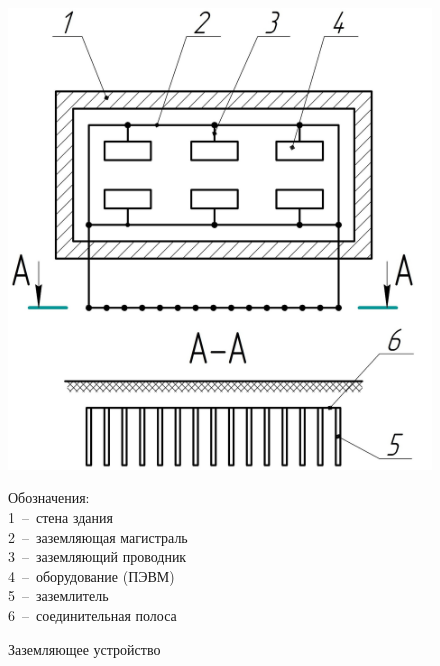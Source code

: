 \documentclass[14pt,oneside,final]{extreport}
\begin{document}
\begin{figure}
\centering	
\noindent\begin{minipage}{0.6\textwidth}%
	\includegraphics[scale=0.7]{img/grounding-schema} 
	\caption{Заземляющее устройство}
	\label{fig:grounding-schema}
\end{minipage}%
\begin{minipage}[b]{0.4\textwidth}
	Обозначения:\\
	1~--~стена здания\\
	2~--~заземляющая магистраль\\
	3~--~заземляющий проводник\\
	4~--~оборудование (ПЭВМ)\\
	5~--~заземлитель\\
	6~--~соединительная полоса\\
\hfill%
\end{minipage}
\end{figure}
\end{document}
